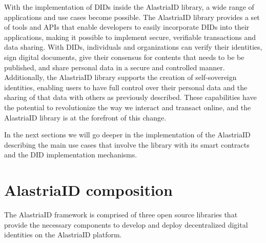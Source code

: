 \documentclass[target=mst,aauheader=]{thud}
\begin{document}
With the implementation of DIDs inside the AlastriaID library, a wide range of applications and use cases become possible. The AlastriaID library provides a set of tools and APIs that enable developers to easily incorporate DIDs into their applications, making it possible to implement secure, verifiable transactions and data sharing. With DIDs, individuals and organizations can verify their identities, sign digital documents, give their consensus for contents that needs to be be published, and share personal data in a secure and controlled manner. Additionally, the AlastriaID library supports the creation of self-sovereign identities, enabling users to have full control over their personal data and the sharing of that data with others as previously described. These capabilities have the potential to revolutionize the way we interact and transact online, and the AlastriaID library is at the forefront of this change.

In the next sections we will go deeper in the implementation of the AlastriaID describing the main use cases that involve the library with its smart contracts and the DID implementation mechanisms.

\section{AlastriaID composition}

The AlastriaID framework is comprised of three open source libraries that provide the necessary components to develop and deploy decentralized digital identities on the AlastriaID platform.
\end{document}

